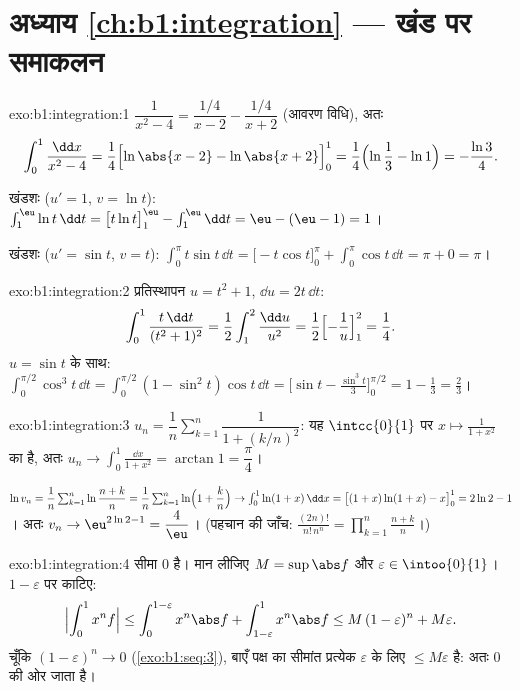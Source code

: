 \section*{अध्याय \ref{ch:b1:integration} --- खंड पर समाकलन}

\begin{solution}{exo:b1:integration:1}
$\dfrac{1}{x^2-4} = \dfrac{1/4}{x - 2} - \dfrac{1/4}{x+2}$ (आवरण विधि), अतः
\[
\int_0^1 \frac{\dd x}{x^2 - 4}
= \frac14\Bigl[\ln\abs{x-2} - \ln\abs{x+2}\Bigr]_0^1
= \frac14\Bigl(\ln\frac{1}{3} - \ln 1\Bigr) = -\frac{\ln 3}{4}.
\]

खंडशः ($u' = 1$, $v = \ln t$): $\int_1^{\eu} \ln t\,\dd t = \bigl[t\ln
t\bigr]_1^{\eu} - \int_1^{\eu} \dd t = \eu - (\eu - 1) = 1$।

खंडशः ($u' = \sin t$, $v = t$): $\int_0^\pi t\sin t\,\dd t = \bigl[-t\cos
t\bigr]_0^\pi + \int_0^\pi \cos t\,\dd t = \pi + 0 = \pi$।
\end{solution}

\begin{solution}{exo:b1:integration:2}
प्रतिस्थापन $u = t^2 + 1$, $\dd u = 2t\,\dd t$:
\[
\int_0^1 \frac{t\,\dd t}{(t^2+1)^2}
= \frac12 \int_1^2 \frac{\dd u}{u^2}
= \frac12\Bigl[-\frac1u\Bigr]_1^2 = \frac14 .
\]
$u = \sin t$ के साथ: $\int_0^{\pi/2} \cos^3 t\,\dd t = \int_0^{\pi/2} (1 -
\sin^2 t)\cos t\,\dd t = \bigl[\sin t - \frac{\sin^3 t}{3}\bigr]_0^{\pi/2} =
1 - \frac13 = \frac23$।
\end{solution}

\begin{solution}{exo:b1:integration:3}
$u_n = \dfrac1n \sum_{k=1}^{n} \dfrac{1}{1 + (k/n)^2}$: यह $\intcc{0}{1}$ पर
$x \mapsto \frac{1}{1+x^2}$ का  है, अतः $u_n \to \int_0^1 \frac{\dd
x}{1+x^2} = \arctan 1 = \dfrac\pi4$।

$\ln v_n = \dfrac1n \sum_{k=1}^{n} \ln\dfrac{n+k}{n} = \dfrac 1n
\sum_{k=1}^n \ln\Bigl(1 + \dfrac kn\Bigr) \to \int_0^1 \ln(1+x)\,\dd x =
\bigl[(1+x)\ln(1+x) - x\bigr]_0^1 = 2\ln 2 - 1$। अतः $v_n \to \eu^{2\ln 2 -
1} = \dfrac 4\eu$। (पहचान की जाँच: $\frac{(2n)!}{n!\,n^n} = \prod_{k=1}^{n}
\frac{n+k}{n}$।)
\end{solution}

\begin{solution}{exo:b1:integration:4}
सीमा $0$ है। मान लीजिए $M = \sup \abs f$ और $\varepsilon \in \intoo{0}{1}$।
$1 - \varepsilon$ पर काटिए:
\[
\Bigl| \int_0^1 x^n f \Bigr|
\leq \int_0^{1 - \varepsilon} x^n \abs f + \int_{1-\varepsilon}^1
x^n \abs f
\leq M\,(1-\varepsilon)^n + M\varepsilon .
\]
चूँकि $(1 - \varepsilon)^n \to 0$ (\cref{exo:b1:seq:3}), बाएँ पक्ष का 
सीमांत प्रत्येक $\varepsilon$ के लिए $\leq M\varepsilon$ है: अतः  $0$
की ओर जाता है।
\end{solution}

